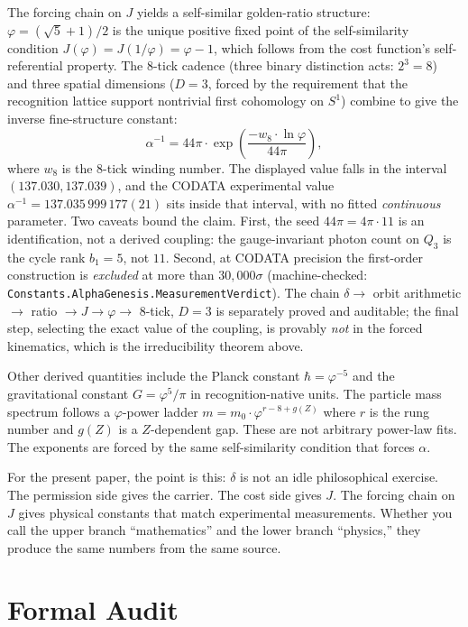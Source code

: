 \documentclass[11pt,a4paper]{article}
\theoremstyle{definition}
\theoremstyle{remark}
\begin{document}
The forcing chain on $J$ yields a self-similar golden-ratio structure:
$\varphi = (\sqrt{5}+1)/2$ is the unique positive fixed point of the
self-similarity condition $J(\varphi) = J(1/\varphi) = \varphi - 1$, which
follows from the cost function's self-referential property. The 8-tick
cadence (three binary distinction acts: $2^3 = 8$) and three spatial
dimensions ($D=3$, forced by the requirement that the recognition lattice
support nontrivial first cohomology on $S^1$) combine to give the inverse
fine-structure constant:
\[
  \alpha^{-1} = 44\pi \cdot \exp\!\left(\frac{-w_8 \cdot \ln\varphi}{44\pi}
  \right),
\]
where $w_8$ is the 8-tick winding number. The displayed value falls in the
interval $(137.030, 137.039)$, and the CODATA experimental value
$\alpha^{-1} = 137.035\,999\,177(21)$ sits inside that interval, with no
fitted \emph{continuous} parameter. Two caveats bound the claim. First,
the seed $44\pi = 4\pi\cdot 11$ is an identification, not a derived
coupling: the gauge-invariant photon count on $Q_3$ is the cycle rank
$b_1 = 5$, not $11$. Second, at CODATA precision the first-order
construction is \emph{excluded} at more than $30{,}000\sigma$
(machine-checked: \texttt{Constants.AlphaGenesis.MeasurementVerdict}).
The chain $\delta \to$ orbit arithmetic $\to$ ratio $\to J \to \varphi
\to$ 8-tick, $D=3$ is separately proved and auditable; the final step,
selecting the exact value of the coupling, is provably \emph{not} in the
forced kinematics, which is the irreducibility theorem above.

Other derived quantities include the Planck constant $\hbar = \varphi^{-5}$
and the gravitational constant $G = \varphi^5/\pi$ in recognition-native
units. The particle mass spectrum follows a $\varphi$-power ladder
$m = m_0 \cdot \varphi^{r - 8 + g(Z)}$ where $r$ is the rung number and
$g(Z)$ is a $Z$-dependent gap. These are not arbitrary power-law fits.
The exponents are forced by the same self-similarity condition that
forces $\alpha$.

For the present paper, the point is this: $\delta$ is not an idle
philosophical exercise. The permission side gives the carrier. The cost side
gives $J$. The forcing chain on $J$ gives physical constants that match
experimental measurements. Whether you call the upper branch ``mathematics''
and the lower branch ``physics,'' they produce the same numbers from the same
source.

\section{Formal Audit}\label{sec:audit}
\end{document}
